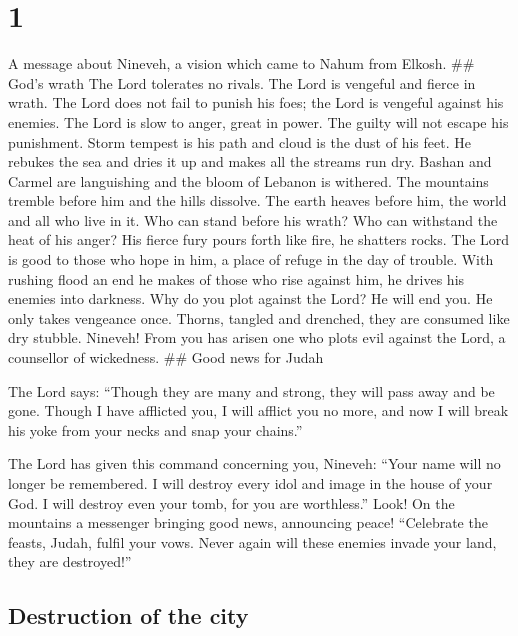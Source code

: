 \hypertarget{section}{%
\section{1}\label{section}}

 A message about Nineveh, a vision which came to Nahum from
Elkosh. \#\# God's wrath  The Lord tolerates no rivals. The
Lord is vengeful and fierce in wrath. The Lord does not fail to punish
his foes; the Lord is vengeful against his enemies.  The
Lord is slow to anger, great in power. The guilty will not escape his
punishment. Storm tempest is his path and cloud is the dust of his feet.
 He rebukes the sea and dries it up and makes all the
streams run dry. Bashan and Carmel are languishing and the bloom of
Lebanon is withered.  The mountains tremble before him and
the hills dissolve. The earth heaves before him, the world and all who
live in it.  Who can stand before his wrath? Who can
withstand the heat of his anger? His fierce fury pours forth like fire,
he shatters rocks.  The Lord is good to those who hope in
him, a place of refuge in the day of trouble.  With rushing
flood an end he makes of those who rise against him, he drives his
enemies into darkness.  Why do you plot against the Lord? He
will end you. He only takes vengeance once.  Thorns,
tangled and drenched, they are consumed like dry stubble. 
Nineveh! From you has arisen one who plots evil against the Lord, a
counsellor of wickedness. \#\# Good news for Judah

 The Lord says: ``Though they are many and strong, they
will pass away and be gone. Though I have afflicted you, I will afflict
you no more,  and now I will break his yoke from your necks
and snap your chains.''

 The Lord has given this command concerning you, Nineveh:
``Your name will no longer be remembered. I will destroy every idol and
image in the house of your God. I will destroy even your tomb, for you
are worthless.''  Look! On the mountains a messenger
bringing good news, announcing peace! ``Celebrate the feasts, Judah,
fulfil your vows. Never again will these enemies invade your land, they
are destroyed!''

\hypertarget{destruction-of-the-city}{%
\subsection{Destruction of the city}\label{destruction-of-the-city}}

